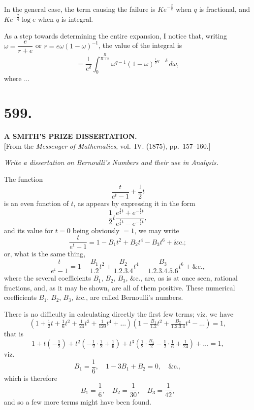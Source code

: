\documentclass[11pt,a4paper]{article}
\begin{document}
In the general case, the term causing the failure is $Ke^{-\frac{2}{q}}$ when
$q$ is fractional, and $Ke^{-\frac{2}{q}}\log e$ when $q$ is integral.

As a step towards determining the entire expansion, I notice that, writing
$\omega = \dfrac{e}{r+e}$ or $r = e\omega(1-\omega)^{-1}$, the value of the
integral is
\[
= \frac{1}{e^{\delta}}\int_0^{\frac{R}{R+e}}
  \omega^{q-1}(1-\omega)^{\frac{1}{2}q-\delta}\,d\omega,
\]
where $\ldots$

\newpage
\section*{599.}
\begin{center}
{\large\bfseries A SMITH'S PRIZE DISSERTATION.}\\[0.5em]
[From the \textit{Messenger of Mathematics}, vol.~IV. (1875), pp.~157--160.]
\end{center}

\begin{center}
\textit{Write a dissertation on Bernoulli's Numbers and their use in Analysis.}
\end{center}

The function
\[
\frac{t}{e^t-1} + \frac{1}{2}t
\]
is an even function of $t$, as appears by expressing it in the form
\[
\frac{1}{2}t\frac{e^{\frac{1}{2}t}+e^{-\frac{1}{2}t}}{e^{\frac{1}{2}t}-e^{-\frac{1}{2}t}},
\]
and its value for $t=0$ being obviously $=1$, we may write
\[
\frac{t}{e^t-1} = 1 - B_1t^2 + B_2t^4 - B_3t^6 + \&\text{c.};
\]
or, what is the same thing,
\[
\frac{t}{e^t-1} = 1 - \frac{B_1}{1.2}t^2 + \frac{B_2}{1.2.3.4}t^4
  - \frac{B_3}{1.2.3.4.5.6}t^6 + \&\text{c.},
\]
where the several coefficients $B_1$, $B_2$, $B_3$, $\&$c., are, as is at once
seen, rational fractions, and, as it may be shown, are all of them positive.
These numerical coefficients $B_1$, $B_2$, $B_3$, $\&$c., are called Bernoulli's
numbers.

There is no difficulty in calculating directly the first few terms; viz. we
have
\[
\left(1 + \tfrac{1}{2}t + \tfrac{1}{6}t^2 + \tfrac{1}{24}t^3
  + \tfrac{1}{120}t^4 + \ldots\right)
\left(1 - \tfrac{B_1}{1.2}t^2 + \tfrac{B_2}{1.2.3.4}t^4 - \ldots\right) = 1,
\]
that is
\[
1 + t\left(-\tfrac{1}{2}\right)
  + t^2\left(-\tfrac{1}{2}\cdot\tfrac{1}{2} + \tfrac{1}{6}\right)
  + t^3\left(\tfrac{1}{2}\cdot\tfrac{B_1}{2} - \tfrac{1}{2}\cdot\tfrac{1}{6}
    + \tfrac{1}{24}\right) + \ldots = 1,
\]
viz.
\[
B_1 = \frac{1}{6},\quad
1 - 3B_1 + B_2 = 0, \quad \&\text{c.},
\]
which is therefore
\[
B_1 = \frac{1}{6}, \quad B_2 = \frac{1}{30}, \quad B_3 = \frac{1}{42},
\]
and so a few more terms might have been found.
\end{document}
